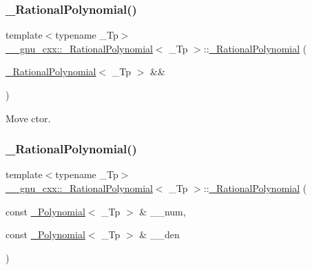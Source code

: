\subsubsection{\texorpdfstring{\+\_\+\+Rational\+Polynomial()}{\_RationalPolynomial()}\hspace{0.1cm}{\footnotesize\ttfamily [3/5]}}
{\footnotesize\ttfamily template$<$typename \+\_\+\+Tp$>$ \\
\hyperlink{class____gnu__cxx_1_1__RationalPolynomial}{\+\_\+\+\_\+gnu\+\_\+cxx\+::\+\_\+\+Rational\+Polynomial}$<$ \+\_\+\+Tp $>$\+::\hyperlink{class____gnu__cxx_1_1__RationalPolynomial}{\+\_\+\+Rational\+Polynomial} (\begin{DoxyParamCaption}\item[{\hyperlink{class____gnu__cxx_1_1__RationalPolynomial}{\+\_\+\+Rational\+Polynomial}$<$ \+\_\+\+Tp $>$ \&\&}]{ }\end{DoxyParamCaption})\hspace{0.3cm}{\ttfamily [default]}}

Move ctor. \mbox{\label{class____gnu__cxx_1_1__RationalPolynomial_aef1f631e89bdeb2976b0629591e4e61e}} 
\subsubsection{\texorpdfstring{\+\_\+\+Rational\+Polynomial()}{\_RationalPolynomial()}\hspace{0.1cm}{\footnotesize\ttfamily [4/5]}}
{\footnotesize\ttfamily template$<$typename \+\_\+\+Tp$>$ \\
\hyperlink{class____gnu__cxx_1_1__RationalPolynomial}{\+\_\+\+\_\+gnu\+\_\+cxx\+::\+\_\+\+Rational\+Polynomial}$<$ \+\_\+\+Tp $>$\+::\hyperlink{class____gnu__cxx_1_1__RationalPolynomial}{\+\_\+\+Rational\+Polynomial} (\begin{DoxyParamCaption}\item[{const \hyperlink{class____gnu__cxx_1_1__Polynomial}{\+\_\+\+Polynomial}$<$ \+\_\+\+Tp $>$ \&}]{\+\_\+\+\_\+num,  }\item[{const \hyperlink{class____gnu__cxx_1_1__Polynomial}{\+\_\+\+Polynomial}$<$ \+\_\+\+Tp $>$ \&}]{\+\_\+\+\_\+den }\end{DoxyParamCaption})\hspace{0.3cm}{\ttfamily [inline]}}



